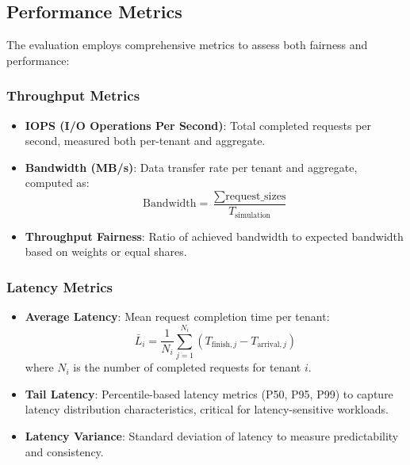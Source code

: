 \documentclass[11pt]{article}
\begin{document}
\subsection{Performance Metrics}

The evaluation employs comprehensive metrics to assess both fairness and performance:

\subsubsection{Throughput Metrics}

\begin{itemize}
    \item \textbf{IOPS (I/O Operations Per Second)}: Total completed requests per second, measured both per-tenant and aggregate.
    \item \textbf{Bandwidth (MB/s)}: Data transfer rate per tenant and aggregate, computed as:
    \begin{equation}
        \text{Bandwidth} = \frac{\sum \text{request\_sizes}}{T_{\text{simulation}}}
    \end{equation}
    \item \textbf{Throughput Fairness}: Ratio of achieved bandwidth to expected bandwidth based on weights or equal shares.
\end{itemize}

\subsubsection{Latency Metrics}

\begin{itemize}
    \item \textbf{Average Latency}: Mean request completion time per tenant:
    \begin{equation}
        \bar{L}_i = \frac{1}{N_i} \sum_{j=1}^{N_i} (T_{\text{finish},j} - T_{\text{arrival},j})
    \end{equation}
    where $N_i$ is the number of completed requests for tenant $i$.
    
    \item \textbf{Tail Latency}: Percentile-based latency metrics (P50, P95, P99) to capture latency distribution characteristics, critical for latency-sensitive workloads.
    
    \item \textbf{Latency Variance}: Standard deviation of latency to measure predictability and consistency.
\end{itemize}
\end{document}

